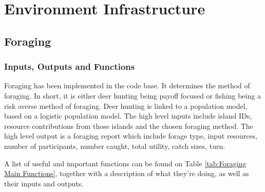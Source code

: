 \chapter{Environment Infrastructure}
\section{Foraging}
\subsection{Inputs, Outputs and Functions}

Foraging has been implemented in the code base. It determines the method of foraging. In short, it is either deer hunting being payoff focused or fishing being a risk averse method of foraging. Deer hunting is linked to a population model, based on a logistic population model. The high level inputs include island IDs, resource contributions from those islands and the chosen foraging method. The high level output is a foraging report which include forage type, input resources, number of participants, number caught, total utility, catch sizes, turn.\newline

A list of useful and important functions can be found on Table \ref{tab:Foraging Main Functions}, together with a description of what they're doing, as well as their inputs and outputs.

